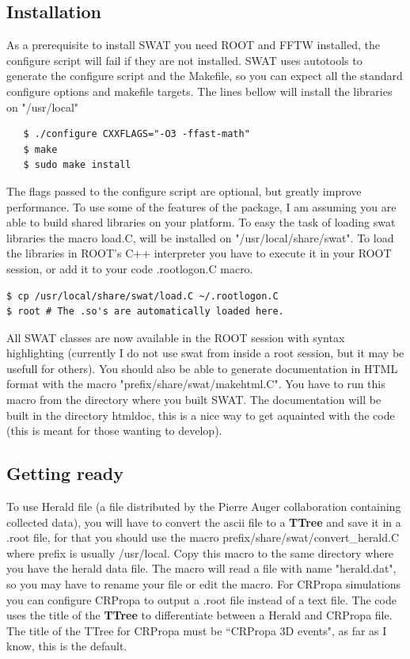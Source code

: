 \documentclass[12pt]{article}
\begin{document}
\subsection{Installation} \label{ch::installation}
As a prerequisite to install SWAT you need ROOT and FFTW installed, the
configure script will fail if they are not installed. SWAT uses autotools to
generate the configure script and the Makefile, so you can expect all the
standard configure options and makefile targets. The lines bellow will install
the libraries on {\color{brown}"/usr/local"}
{\bf \color{brown}
   \begin{lstlisting}
   $ ./configure CXXFLAGS="-O3 -ffast-math"
   $ make
   $ sudo make install
   \end{lstlisting}
}
The flags passed to the configure script are optional, but greatly improve
performance.  To use some of the features of the package, I am assuming you are
able to build shared libraries on your platform. To easy the task of loading
swat libraries the macro load.C, will be installed on
{\color{brown}"/usr/local/share/swat"}. To load the libraries in ROOT's C++
interpreter you have to execute it in your ROOT session, or add it to
your code {\color{brown}.rootlogon.C} macro.

{\bf \color{brown}
\begin{lstlisting}
$ cp /usr/local/share/swat/load.C ~/.rootlogon.C
$ root # The .so's are automatically loaded here.
\end{lstlisting}
}

All SWAT classes are now available in the ROOT session with syntax highlighting
(currently I do not use swat from inside a root session, but it may be usefull
for others). You should also be able to generate documentation in HTML format
with the macro {\color{brown}"prefix/share/swat/makehtml.C"}. You have to run
this macro from the directory where you built SWAT. The documentation will be
built in the directory {\color{brown}htmldoc}, this is a nice way to get aquainted with 
the code (this is meant for those wanting to develop).

\subsection{Getting ready} \label{ch::ready}

To use Herald file (a file distributed by the Pierre Auger collaboration containing collected data),
you will have to convert the ascii file to a {\bf TTree} and
save it in a .root file, for that you should use the macro
{\color{brown}prefix/share/swat/convert\_herald.C} where prefix is usually
{\color{brown}/usr/local}.  Copy this macro to the same directory where you have the
herald data file. The macro will read a file with name
{\color{brown}"herald.dat"}, so you may have to rename your file or edit the macro. 
For CRPropa simulations you can configure CRPropa to output a .root file
instead of a text file.  The code uses the title of the {\bf TTree} to differentiate
between a Herald and CRPropa file. The title of the TTree for CRPropa must be
``{\color{textcolor}CRPropa 3D events}", as far as I know, this is the default.
\end{document}
